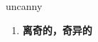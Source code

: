 
\begin{frame}
{\huge uncanny}
\begin{center}
\begin{enumerate}\Large
  \item \textbf{离奇的，奇异的}
\end{enumerate}
\end{center}
\end{frame}
